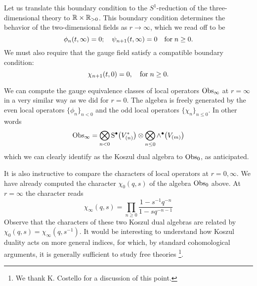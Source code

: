\documentclass[11pt]{amsart}
\def\brian#1{{\textcolor{blue!65!red}{BRW: {#1}}}}
\begin{document}
Let us translate this boundary condition to the $S^1$-reduction of the three-dimensional theory to $\mathbb R \times \mathbb R_{>0}$. 
This boundary condition determines the behavior of the two-dimensional fields as $r \to \infty$, which we read off to be 
\begin{equation}\label{eqn:bc2}
\phi_n (t, \infty) = 0 ; \quad \psi_{n+1} (t, \infty) = 0 \quad {\rm for} \; n \geq 0 .
\end{equation}
We must also require that the gauge field satisfy a compatible boundary condition:
\begin{equation}\label{eqn:gbc2}
\chi_{n+1} (t,0) = 0, \quad {\rm for} \; n \geq 0 .
\end{equation}

We can compute the gauge equivalence classes of local operators ${\rm Obs}_\infty$ at $r = \infty$ in a very similar way as we did for $r = 0$. 
The algebra is freely generated by the even local operators $\{\phi_n\}_{n < 0}$ and the odd local operators $\{\chi_n\}_{n \leq 0}$. 
In other words
\[
{\rm Obs}_\infty = \bigotimes_{n < 0} {\rm S}^\bullet \big(V^*_{(n)}\big) \otimes \bigotimes_{n \leq 0} \wedge^\bullet \big(V_{(m)}\big)
\]
which we can clearly identify as the Koszul dual algebra to ${\rm Obs}_0$, as anticipated.

It is also instructive to compare the characters of local operators at $r = 0, \infty$. 
We have already computed the character $\chi_0(q,s)$ of the algebra ${\rm Obs}_0$ above. 
At $r=\infty$ the character reads 
\[
\chi_\infty (q,s) = \prod_{n \geq 0} \frac{1 - s^{-1}q^{-n}}{1 - s q^{-n-1}}
\]
Observe that the characters of these two Koszul dual algebras are related by $\chi_0 (q,s) = \chi_\infty (q, s^{-1})$. It would be interesting to understand how Koszul duality acts on more general indices, for which, by standard cohomological arguments, it is generally sufficient to study free theories \footnote{We thank K. Costello for a discussion of this point.}.
\end{document}
